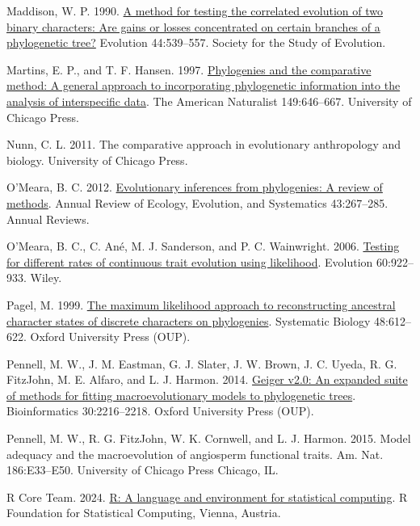 \documentclass[fleqn,10pt,lineno]{wlpeerj} %
\newlength{\cslhangindent}
\newenvironment{CSLReferences}[2] %
 {\begin{list}{}{%
  \setlength{\itemindent}{0pt}
  \setlength{\leftmargin}{0pt}
  \setlength{\parsep}{0pt}
  \ifodd #1
   \setlength{\leftmargin}{\cslhangindent}
   \setlength{\itemindent}{-1\cslhangindent}
  \fi
  \setlength{\itemsep}{#2\baselineskip}}}
 {\end{list}}
\begin{document}
\begin{CSLReferences}{1}{0}
Maddison, W. P. 1990. \href{https://doi.org/10.2307/2409435}{A method for testing the correlated evolution of two binary characters: Are gains or losses concentrated on certain branches of a phylogenetic tree?} Evolution 44:539--557. Society for the Study of Evolution.

Martins, E. P., and T. F. Hansen. 1997. \href{https://doi.org/10.1086/286013}{Phylogenies and the comparative method: A general approach to incorporating phylogenetic information into the analysis of interspecific data}. The American Naturalist 149:646--667. University of Chicago Press.

Nunn, C. L. 2011. The comparative approach in evolutionary anthropology and biology. University of Chicago Press.

O'Meara, B. C. 2012. \href{https://doi.org/10.1146/annurev-ecolsys-110411-160331}{Evolutionary inferences from phylogenies: A review of methods}. Annual Review of Ecology, Evolution, and Systematics 43:267--285. Annual Reviews.

O'Meara, B. C., C. Ané, M. J. Sanderson, and P. C. Wainwright. 2006. \href{https://doi.org/10.1111/j.0014-3820.2006.tb01171.x}{Testing for different rates of continuous trait evolution using likelihood}. Evolution 60:922--933. Wiley.

Pagel, M. 1999. \href{https://doi.org/10.1080/106351599260184}{The maximum likelihood approach to reconstructing ancestral character states of discrete characters on phylogenies}. Systematic Biology 48:612--622. Oxford University Press (OUP).

Pennell, M. W., J. M. Eastman, G. J. Slater, J. W. Brown, J. C. Uyeda, R. G. FitzJohn, M. E. Alfaro, and L. J. Harmon. 2014. \href{https://doi.org/10.1093/bioinformatics/btu181}{Geiger v2.0: An expanded suite of methods for fitting macroevolutionary models to phylogenetic trees}. Bioinformatics 30:2216--2218. Oxford University Press (OUP).

Pennell, M. W., R. G. FitzJohn, W. K. Cornwell, and L. J. Harmon. 2015. Model adequacy and the macroevolution of angiosperm functional traits. Am. Nat. 186:E33--E50. University of Chicago Press Chicago, IL.

R Core Team. 2024. \href{https://www.R-project.org/}{R: A language and environment for statistical computing}. R Foundation for Statistical Computing, Vienna, Austria.


\end{CSLReferences}
\end{document}
